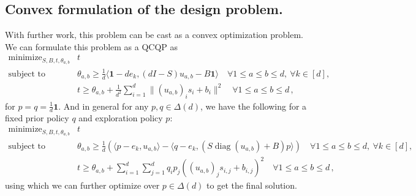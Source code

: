 \subsection{Convex formulation of the design problem.}
\label{sec:convex_program_formulation}
With further work, this problem can be cast as a convex optimization problem.
We can formulate this problem as a QCQP as
\[
    \boxed{
        \begin{array}{ll}
            \text{minimize}_{S,B,t,\theta_{a,b}} & t                                                                                                 \\[1mm]
            \text{subject to}
                                                 & \theta_{a,b} \ge \frac{1}{d} \langle \mathbf{1} - d e_k, (d I - S) u_{a,b} - B \mathbf{1} \rangle
            \quad \forall 1\le a\le b\le d,\ \forall k\in[d],                                                                                        \\[1mm]
                                                 & t \ge \theta_{a,b}+\frac{1}{d^2}\sum_{i=1}^d\|(u_{a,b})_i s_i+b_i\|^2
            \quad \forall 1\le a\le b\le d\,,
        \end{array}
    }
\]
for $p = q = \frac{1}{d} \mathbf{1}$.
And in general for any $p, q \in \Delta(d)$, we have the following for a fixed prior policy $q$ and exploration policy $p$:
\[
    \boxed{
        \begin{array}{ll}
            \text{minimize}_{S,B,t,\theta_{a,b}} & t                                                                                                                                           \\[1mm]
            \text{subject to}
                                                 & \theta_{a,b} \ge \frac{1}{d}\left(\langle p - e_k, u_{a,b} \rangle - \langle q - e_k, (S \operatorname{diag}(u_{a,b}) + B) p \rangle\right)
            \quad \forall 1\le a\le b\le d,\ \forall k\in[d],                                                                                                                                  \\[1mm]
                                                 & t \ge \theta_{a,b}+\sum_{i=1}^d \sum_{j=1}^d q_i p_j ((u_{a,b})_j s_{i,j} + b_{i,j})^2
            \quad \forall 1\le a\le b\le d\,,
        \end{array}
    }
\]
using which we can further optimize over $p \in \Delta(d)$ to get the final solution.

